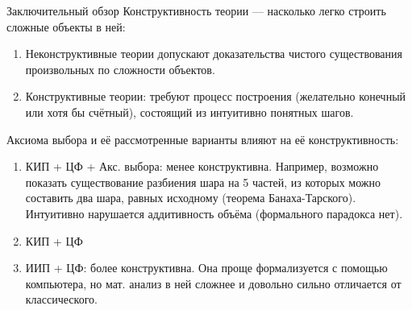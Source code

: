 \documentclass[aspectratio=169]{beamer}
\begin{document}
\begin{frame}{Заключительный обзор}
Конструктивность теории --- насколько легко строить сложные объекты в ней:
\begin{enumerate}
\item Неконструктивные теории допускают доказательства чистого существования произвольных по сложности объектов.
\item Конструктивные теории: требуют процесс построения (желательно конечный или хотя бы счётный), 
состоящий из интуитивно понятных шагов.
\end{enumerate}

Аксиома выбора и её рассмотренные варианты влияют на её конструктивность:
\begin{enumerate}
\item КИП + ЦФ + Акс. выбора: менее конструктивна.
Например, возможно показать существование разбиения шара на 5 частей, из которых можно составить два шара,
равных исходному (теорема Банаха-Тарского).
Интуитивно нарушается аддитивность объёма (формального парадокса нет).

\item КИП + ЦФ
\item ИИП + ЦФ: более конструктивна. Она проще формализуется с помощью компьютера, но мат. анализ в ней сложнее и довольно сильно отличается от классического.
\end{enumerate}
\end{frame}
\end{document}
